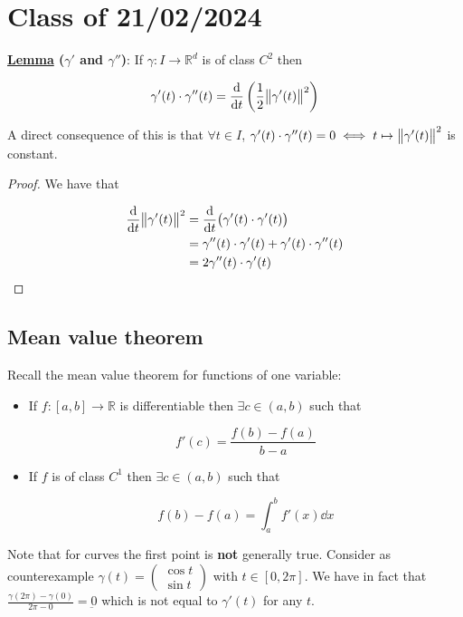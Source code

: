 \documentclass[10pt]{extarticle}
\newcommand{\R}{\mathbb{R}}
\newcommand{\munderbar}[1]{\underbar{\ensuremath{#1}}}
\begin{document}
\section{Class of 21/02/2024}

\textbf{\underline{Lemma} ($\gamma'$ and $\gamma''$)}:
If $\gamma: I \to \R^d$ is of class $C^2$ then

$$
    \gamma'(t) \cdot \gamma''(t) = \dv{t}\left(\frac{1}{2}\norm{\gamma'(t)}^2\right)
$$

A direct consequence of this is that $\forall t \in I$, $\gamma'(t) \cdot \gamma''(t) = 0 \iff t \mapsto \norm{\gamma'(t)}^2$ is constant.

\begin{proof}
    We have that

    \begin{align*}
        \dv{t}\norm{\gamma'(t)}^2 & = \dv{t}(\gamma'(t) \cdot \gamma'(t))                         \\
                                  & = \gamma''(t) \cdot \gamma'(t) + \gamma'(t) \cdot \gamma''(t) \\
                                  & = 2 \gamma''(t) \cdot \gamma'(t)
    \end{align*}
\end{proof}

\subsection{Mean value theorem}

Recall the mean value theorem for functions of one variable:

\begin{itemize}
    \item If $f : [a, b] \to \R$ is differentiable then $\exists c \in (a, b)$ such that

          $$
              f'(c) = \frac{f(b) - f(a)}{b - a}
          $$

    \item If $f$ is of class $C^1$ then $\exists c \in (a, b)$ such that

          $$
              f(b) - f(a) = \int_a^b f'(x) \dd{x}
          $$
\end{itemize}

Note that for curves the first point is \textbf{not} generally true.
Consider as counterexample $\gamma(t) = \begin{pmatrix}
        \cos t \\ \sin t
    \end{pmatrix}$ with $t \in [0, 2\pi]$.
We have in fact that $ \frac{\gamma(2\pi) - \gamma(0)}{2\pi - 0} = \munderbar{0}$ which is not equal to $\gamma'(t)$ for any $t$.
\end{document}
